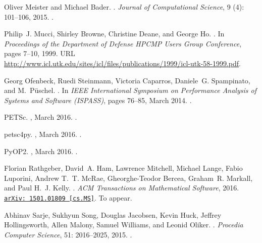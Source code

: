 \documentclass[11pt, a4paper]{scrartcl}
\begin{document}
\begin{thebibliography}{35}
Oliver Meister and Michael Bader.
.
\newblock \emph{Journal of Computational Science}, 9 (4):
  101--106, 2015.
\newblock {}.

Philip~J. Mucci, Shirley Browne, Christine Deane, and George Ho.
.
\newblock In \emph{Proceedings of the Department of Defense HPCMP Users Group
  Conference}, pages 7--10, 1999.
\newblock URL
  \url{http://www.icl.utk.edu/sites/icl/files/publications/1999/icl-utk-58-1999.pdf}.

Georg Ofenbeck, Ruedi Steinmann, Victoria Caparros, Daniele~G. Spampinato, and
  M.~P\"uschel.
.
\newblock In \emph{IEEE International Symposium on Performance Analysis of
  Systems and Software (ISPASS)}, pages 76--85, March 2014.
\newblock {}.

PETSc.
, March
  2016.
\newblock {}.

petsc4py.
, March 2016.
\newblock {}.

PyOP2.
, March 2016.
\newblock {}.

Florian Rathgeber, David~A. Ham, Lawrence Mitchell, Michael Lange, Fabio
  Luporini, Andrew T.~T. McRae, Gheorghe-Teodor Bercea, Graham~R. Markall, and
  Paul H.~J. Kelly.
.
\newblock \emph{ACM Transactions on Mathematical Software}, 2016.
\newblock
  \href{http://arxiv.org/abs/1501.01809}{{\small\texttt{arXiv:\,1501.01809
  [cs.MS]}}}.
\newblock To appear.

Abhinav Sarje, Sukhyun Song, Douglas Jacobsen, Kevin Huck, Jeffrey
  Hollingsworth, Allen Malony, Samuel Williams, and Leonid Oliker.
.
\newblock \emph{Procedia Computer Science}, 51: 2016--2025, 2015.
\newblock {}.


\end{thebibliography}
\end{document}
